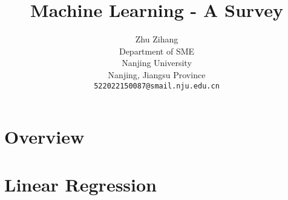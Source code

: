 \documentclass{arxiv_art/arxiv_art}
\title{Machine Learning - A Survey}
\author{
    \hspace{1mm}Zhu Zihang \\
    Department of SME \\
    Nanjing University\\
    Nanjing, Jiangsu Province \\
    \texttt{522022150087@smail.nju.edu.cn}
}
\begin{document}
\maketitle

\begin{abstract}
    
\end{abstract}

\section{Overview}\label{sec:overview}


\section{Linear Regression}\label{sec:linear_regression}




\end{document}

